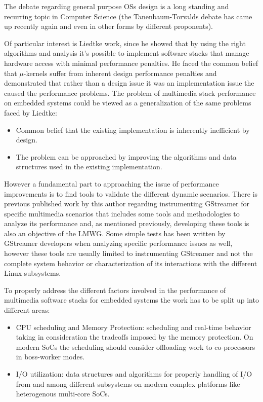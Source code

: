 The debate regarding general purpose \aclp{OS} design is a long standing and recurring topic in Computer Science (the Tanenbaum-Torvalds debate \cite{DiBona:1999:OSV:553109} has came up recently again\cite{Tanenbaum:fk} and even in other forms by different proponents\cite{Heiser:uq}). 

Of particular interest is Liedtke\citep{Liedtke:1995kx} work, since he showed that by using the right algorithms and analysis it's possible to implement software stacks that manage hardware access with minimal performance penalties. He faced the common belief that $\mu$-kernels suffer from inherent design performance penalties and demonstrated that rather than a design issue it was an implementation issue the caused the performance problems. The problem of multimedia stack performance on embedded systems could be viewed as a generalization of the same problems faced by Liedtke:
\begin{itemize}
\item Common belief that the existing implementation is inherently inefficient by design.
\item The problem can be approached by improving the algorithms and data structures used in the existing implementation.
\end{itemize}

However a fundamental part to approaching the issue of performance improvements is to find tools to validate the different dynamic scenarios. There is previous published work by this author regarding instrumenting GStreamer for specific multimedia scenarios\cite{Dompe:2011ys} that includes some tools and methodologies to analyze its performance and, as mentioned previously, developing these tools is also an objective of the \ac{LMWG}. Some simple tests has been written by GStreamer developers when analyzing specific performance issues\cite{Contreras:vn} as well, however these tools are usually limited to instrumenting GStreamer and not the complete system behavior or characterization of its interactions with the different Linux subsystems.

To properly address the different factors involved in the performance of multimedia software stacks for embedded systems the work has to be split up into different areas:
\begin{itemize}
\item CPU scheduling and Memory Protection: scheduling and real-time behavior taking in consideration the tradeoffs imposed by the memory protection. On modern \acp{SoC} the scheduling should consider offloading work to co-processors in boss-worker modes.
\item I/O utilization: data structures and algorithms for properly handling of I/O from and among different subsystems on modern complex platforms like heterogenous multi-core \acp{SoC}.
\end{itemize}

